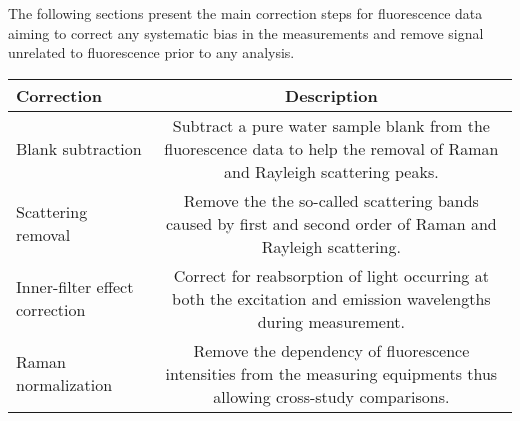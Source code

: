 \documentclass[]{book}
\begin{document}
The following sections present the main correction steps for
fluorescence data aiming to correct any systematic bias in the
measurements and remove signal unrelated to fluorescence prior to any
analysis.

\begin{longtable}[]{@{}lc@{}}
\toprule
\begin{minipage}[b]{0.25\columnwidth}\raggedright\strut
Correction\strut
\end{minipage} & \begin{minipage}[b]{0.46\columnwidth}\centering\strut
Description\strut
\end{minipage}\tabularnewline
\midrule
\endhead
\begin{minipage}[t]{0.25\columnwidth}\raggedright\strut
Blank subtraction\strut
\end{minipage} & \begin{minipage}[t]{0.46\columnwidth}\centering\strut
Subtract a pure water sample blank from the fluorescence data to help
the removal of Raman and Rayleigh scattering peaks.\strut
\end{minipage}\tabularnewline
\begin{minipage}[t]{0.25\columnwidth}\raggedright\strut
Scattering removal\strut
\end{minipage} & \begin{minipage}[t]{0.46\columnwidth}\centering\strut
Remove the the so-called scattering bands caused by first and second
order of Raman and Rayleigh scattering.\strut
\end{minipage}\tabularnewline
\begin{minipage}[t]{0.25\columnwidth}\raggedright\strut
Inner-filter effect correction\strut
\end{minipage} & \begin{minipage}[t]{0.46\columnwidth}\centering\strut
Correct for reabsorption of light occurring at both the excitation and
emission wavelengths during measurement.\strut
\end{minipage}\tabularnewline
\begin{minipage}[t]{0.25\columnwidth}\raggedright\strut
Raman normalization\strut
\end{minipage} & \begin{minipage}[t]{0.46\columnwidth}\centering\strut
Remove the dependency of fluorescence intensities from the measuring
equipments thus allowing cross-study comparisons.\strut
\end{minipage}\tabularnewline
\bottomrule
\end{longtable}
\end{document}
